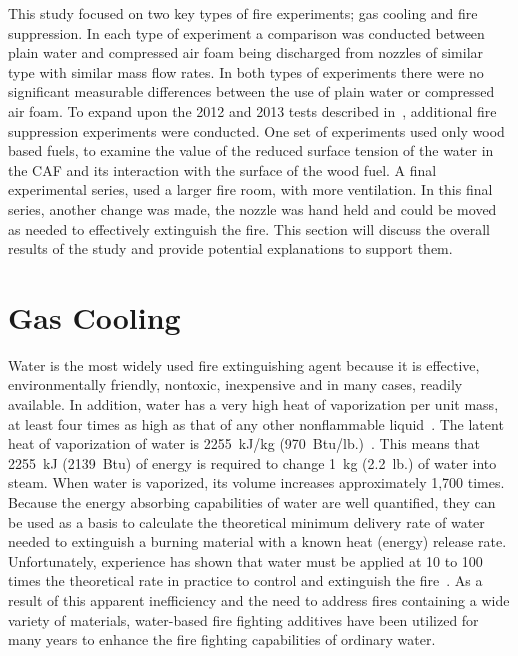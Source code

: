 \documentclass[12pt,oneside]{book}
\begin{document}
This study focused on two key types of fire experiments; gas cooling and fire suppression. In each type of experiment a comparison was conducted between plain water and compressed air foam being discharged from nozzles of similar type with similar mass flow rates. In both types of experiments there were no significant measurable differences between the use of plain water or compressed air foam. To expand upon the 2012 and 2013 tests described in~\cite{Mitchell:1}, additional fire suppression experiments were conducted. One set of experiments used only wood based fuels, to examine the value of the reduced surface tension of the water in the CAF and its interaction with the surface of the wood fuel. A final experimental series, used a larger fire room, with more ventilation. In this final series, another change was made, the nozzle was hand held and could be moved as needed to effectively extinguish the fire. This section will discuss the overall results of the study and provide potential explanations to support them.

\section{Gas Cooling}
\label{sec:Gas_Cooling_discuss}
 
Water is the most widely used fire extinguishing agent because it is effective, environmentally friendly, nontoxic, inexpensive and in many cases, readily available. In addition, water has a very high heat of vaporization per unit mass, at least four times as high as that of any other nonflammable liquid~\cite{NFPA}. The latent heat of vaporization of water is 2255~kJ/kg (970~Btu/lb.)~\cite{NFPA}. This means that 2255~kJ (2139~Btu) of energy is required to change 1~kg (2.2~lb.) of water into steam. When water is vaporized, its volume increases approximately 1,700 times. Because the energy absorbing capabilities of water are well quantified, they can be used as a basis to calculate the theoretical minimum delivery rate of water needed to extinguish a burning material with a known heat (energy) release rate. Unfortunately, experience has shown that water must be applied at 10 to 100 times the theoretical rate in practice to control and extinguish the fire~\cite{Friedman:2}. As a result of this apparent inefficiency and the need to address fires containing a wide variety of materials, water-based fire fighting additives have been utilized for many years to enhance the fire fighting capabilities of ordinary water.
\end{document}

